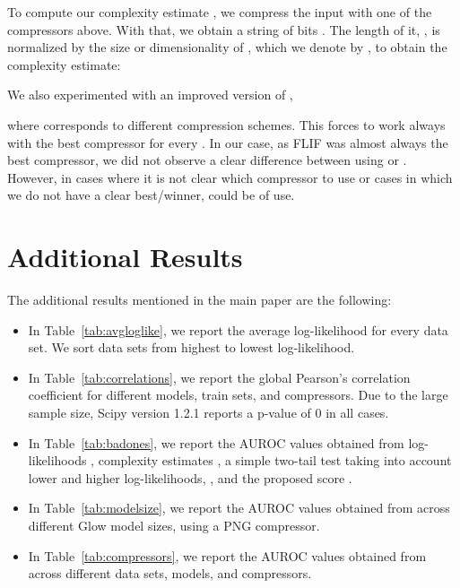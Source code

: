\documentclass[letterpaper]{article} \usepackage{iclr2020_conference,times}
\begin{document}
To compute our complexity estimate , we compress the input  with one of the compressors  above. With that, we obtain a string of bits . The length of it, , is normalized by the size or dimensionality of , which we denote by , to obtain the complexity estimate:


We also experimented with an improved version of ,

where  corresponds to different compression schemes. This forces  to work always with the best compressor for every . In our case, as FLIF was almost always the best compressor, we did not observe a clear difference between using  or . However, in cases where it is not clear which compressor to use or cases in which we do not have a clear best/winner,  could be of use.


\section{Additional Results}
\label{sec:additional_results}

The additional results mentioned in the main paper are the following:
\begin{itemize}
\item In Table~\ref{tab:avgloglike}, we report the average log-likelihood  for every data set. We sort data sets from highest to lowest log-likelihood. 
\item In Table~\ref{tab:correlations}, we report the global Pearson's correlation coefficient for different models, train sets, and compressors. Due to the large sample size, Scipy version 1.2.1 reports a p-value of 0 in all cases.
\item In Table~\ref{tab:badones}, we report the AUROC values obtained from log-likelihoods , complexity estimates , a simple two-tail test  taking into account lower and higher log-likelihoods, , and the proposed score .
\item In Table~\ref{tab:modelsize}, we report the AUROC values obtained from  across different Glow model sizes, using a PNG compressor.
\item In Table~\ref{tab:compressors}, we report the AUROC values obtained from  across different data sets, models, and compressors.
\end{itemize}
\end{document}
